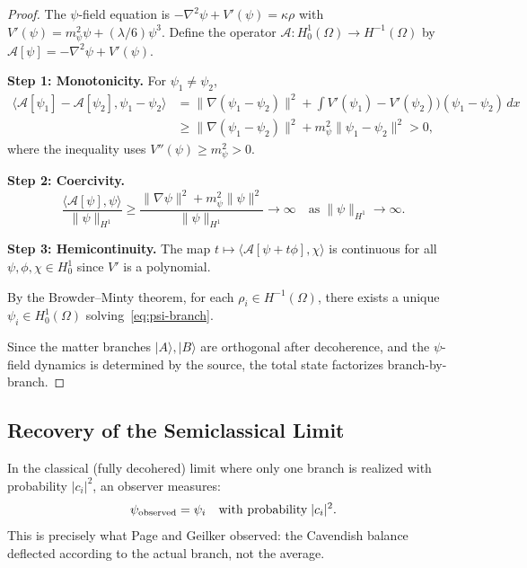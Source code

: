 \documentclass[11pt,a4paper]{article}
\theoremstyle{remark}
\begin{document}
\begin{proof}
The $\psi$-field equation is $-\nabla^2\psi + V'(\psi) = \kappa\rho$ with
$V'(\psi) = m_\psi^2\psi + (\lambda/6)\psi^3$. Define the operator
$\mathcal{A}: H^1_0(\Omega) \to H^{-1}(\Omega)$ by
$\mathcal{A}[\psi] = -\nabla^2\psi + V'(\psi)$.

\textbf{Step 1: Monotonicity.} For $\psi_1 \neq \psi_2$,
\begin{align}
\langle \mathcal{A}[\psi_1] - \mathcal{A}[\psi_2], \psi_1 - \psi_2\rangle
&= \|\nabla(\psi_1 - \psi_2)\|^2 + \int V'(\psi_1) - V'(\psi_2))(\psi_1 - \psi_2)\,dx \\
&\geq \|\nabla(\psi_1 - \psi_2)\|^2 + m_\psi^2\|\psi_1 - \psi_2\|^2 > 0,
\end{align}
where the inequality uses $V''(\psi) \geq m_\psi^2 > 0$.

\textbf{Step 2: Coercivity.}
\begin{equation}
\frac{\langle \mathcal{A}[\psi], \psi\rangle}{\|\psi\|_{H^1}} \geq
\frac{\|\nabla\psi\|^2 + m_\psi^2\|\psi\|^2}{\|\psi\|_{H^1}} \to \infty
\quad\text{as}\;\|\psi\|_{H^1} \to \infty.
\end{equation}

\textbf{Step 3: Hemicontinuity.} The map $t \mapsto \langle\mathcal{A}[\psi + t\phi], \chi\rangle$
is continuous for all $\psi, \phi, \chi \in H^1_0$ since $V'$ is a polynomial.

By the Browder--Minty theorem, for each $\rho_i \in H^{-1}(\Omega)$,
there exists a unique $\psi_i \in H^1_0(\Omega)$ solving~\eqref{eq:psi-branch}.

Since the matter branches $|A\rangle, |B\rangle$ are orthogonal after
decoherence, and the $\psi$-field dynamics is determined by the source,
the total state factorizes branch-by-branch.
\end{proof}

\subsection{Recovery of the Semiclassical Limit}

In the classical (fully decohered) limit where only one branch is realized
with probability $|c_i|^2$, an observer measures:
\begin{equation}
\psi_{\rm observed} = \psi_i \quad\text{with probability}\;|c_i|^2.
\end{equation}
This is precisely what Page and Geilker observed: the Cavendish balance
deflected according to the actual branch, not the average.
\end{document}
